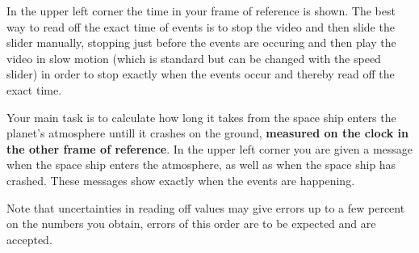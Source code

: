{\begin{multicols}{2}
In the upper left corner the time in your frame of reference is shown.  The best way to read off the exact time of events is to stop the video and then slide the slider manually, stopping just before the events are occuring and then play the video in slow motion (which is standard but can be changed with the speed slider) in order to stop exactly when the events occur and thereby read off the exact time.

Your main task is to calculate how long it takes from the space ship enters the planet's atmosphere untill it crashes on the ground, {\bf measured on the clock in the other frame of reference}. In the upper left corner you are given a message when the space ship enters the atmosphere, as well as when the space ship has crashed. These messages show exactly when the events are happening.

Note that uncertainties in reading off values may give errors up to a few percent on the numbers you obtain, errors of this order are to be expected and are accepted.


\end{multicols}}
